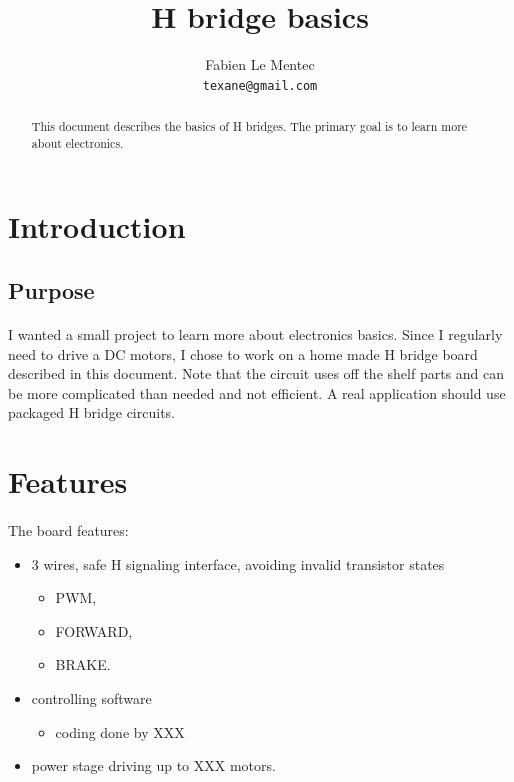 \documentclass[12pt]{article}
\title{H bridge basics}
\author{Fabien Le Mentec\\
\small \texttt{texane@gmail.com}
}
\date{}
\begin{document}
\maketitle

\begin{abstract}
This document describes the basics of H bridges. The primary goal is to learn more about electronics.
\end{abstract}


\newpage
\section{Introduction}

\subsection{Purpose}
\paragraph{} I wanted a small project to learn more about electronics basics. Since I regularly need to
drive a DC motors, I chose to work on a home made H bridge board described in this document. Note that
the circuit uses off the shelf parts and can be more complicated than needed and not efficient. A real
application should use packaged H bridge circuits.


\newpage
\section{Features}
\paragraph{} The board features:
\begin{itemize}
  \item 3 wires, safe H signaling interface, avoiding invalid transistor states
    \begin{itemize}
      \item PWM,
      \item FORWARD,
      \item BRAKE.
    \end{itemize}
  \item controlling software
    \begin{itemize}
      \item coding done by XXX
    \end{itemize}
  \item power stage driving up to XXX motors.
\end{itemize}
\end{document}
